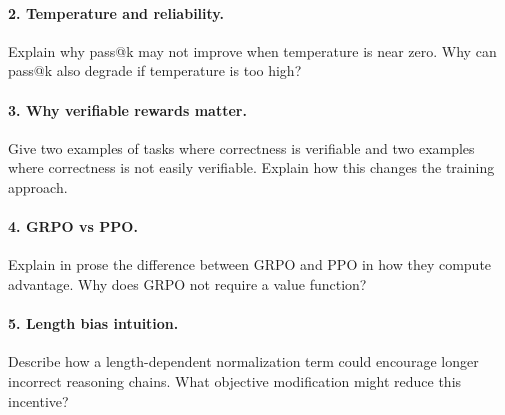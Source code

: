 \paragraph{2. Temperature and reliability.}
Explain why pass@k may not improve when temperature is near zero. Why can pass@k also degrade if temperature is too high?

\paragraph{3. Why verifiable rewards matter.}
Give two examples of tasks where correctness is verifiable and two examples where correctness is not easily verifiable. Explain how this changes the training approach.

\paragraph{4. GRPO vs PPO.}
Explain in prose the difference between GRPO and PPO in how they compute advantage. Why does GRPO not require a value function?

\paragraph{5. Length bias intuition.}
Describe how a length-dependent normalization term could encourage longer incorrect reasoning chains. What objective modification might reduce this incentive?
